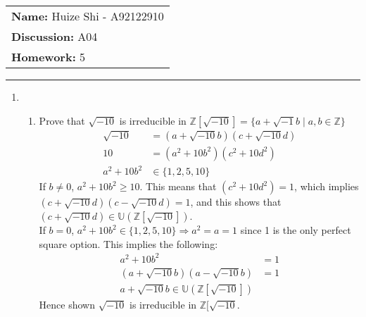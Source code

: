 \documentclass[12pt]{article}
\begin{document}
\null\hfill\begin{tabular}[t]{l@{}}
	\textbf{Name: }Huize Shi - A92122910 \\
	\textbf{Discussion: }A04 \\
	\textbf{Homework: }5
\end{tabular}
\noindent\rule{\textwidth}{0.5pt}

\begin{enumerate}
	\item
		\begin{enumerate}
			\item Prove that $\sqrt{-10}$ is irreducible in $\mathbb{Z}[\sqrt{-10}] =
				\{a+\sqrt{-1}b \mid a,b\in \mathbb{Z}\}$
				\begin{align*}
					\sqrt{-10} &= (a+\sqrt{-10}b)(c+\sqrt{-10}d)\\
					10 &= (a^2+10b^2)(c^2+10d^2)\\
					a^2 + 10b^2 &\in \{1, 2, 5, 10\}
				\end{align*}
				If $b\neq0$, $a^2 + 10b^2 \ge 10$. This means that $(c^2+10d^2) = 1$,
				which implies $(c+\sqrt{-10}d)(c-\sqrt{-10}d)=1$, and this shows that
				$(c+\sqrt{-10}d) \in \mathbb{U}(\mathbb{Z}[\sqrt{-10}])$.\\
				If $b=0$, $a^2 + 10b^2 \in \{1, 2, 5, 10\} \Rightarrow a^2=a=1$ since 1
				is the only perfect square option. This implies the following:
				\begin{align*}
					a^2 + 10b^2 &= 1\\
					(a+\sqrt{-10}b)(a-\sqrt{-10}b) &= 1\\
					a+\sqrt{-10}b \in \mathbb{U}(\mathbb{Z}[\sqrt{-10}])
				\end{align*}
				Hence shown $\sqrt{-10}$ is irreducible in $\mathbb{Z}[\sqrt{-10}$.


\end{enumerate}
\end{enumerate}
\end{document}
